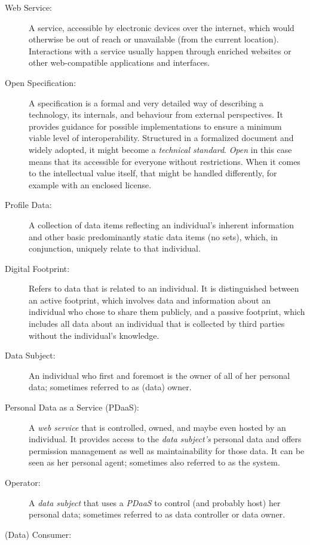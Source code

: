 \documentclass[12pt,english,a4paper,titlepage,cleardoublepage=empty,dottedtoc]{report}
\begin{document}
\begin{description}
\item[Web Service:]
A service, accessible by electronic devices over the internet, which
would otherwise be out of reach or unavailable (from the current
location). Interactions with a service usually happen through enriched
websites or other web-compatible applications and interfaces.
\item[Open Specification:]
A specification is a formal and very detailed way of describing a
technology, its internals, and behaviour from external perspectives. It
provides guidance for possible implementations to ensure a minimum
viable level of interoperability. Structured in a formalized document
and widely adopted, it might become a \emph{technical standard}.
\emph{Open} in this case means that its accessible for everyone without
restrictions. When it comes to the intellectual value itself, that might
be handled differently, for example with an enclosed license.
\item[\protect\hypertarget{terminologies--profile-data}{}{Profile
Data}:]
A collection of data items reflecting an individual's inherent
information and other basic predominantly static data items (no sets),
which, in conjunction, uniquely relate to that individual.
\item[\protect\hypertarget{terminologies--digital-footprint}{}{Digital
Footprint}:]
Refers to data that is related to an individual. It is distinguished
between an active footprint, which involves data and information about
an individual who chose to share them publicly, and a passive footprint,
which includes all data about an individual that is collected by third
parties without the individual's knowledge.
\item[Data Subject:]
An individual who first and foremost is the owner of all of her personal
data; sometimes referred to as (data) owner.
\item[Personal Data as a Service (PDaaS):]
A \emph{web service} that is controlled, owned, and maybe even hosted by
an individual. It provides access to the \emph{data subject's} personal
data and offers permission management as well as maintainability for
those data. It can be seen as her personal agent; sometimes also
referred to as the system.
\item[\protect\hypertarget{terminologies--operator}{}{Operator}:]
A \emph{data subject} that uses a \emph{PDaaS} to control (and probably
host) her personal data; sometimes referred to as data controller or
data owner.
\item[\protect\hypertarget{terminologies--consumer}{}{(Data) Consumer}:]

\end{description}
\end{document}
